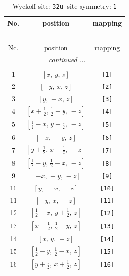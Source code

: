 \documentclass[fleqn,8pt]{jsarticle}
\begin{document}
\renewcommand{\arraystretch}{1.2}
\begin{longtable}{ccc}
\caption{Wyckoff site: {\tt 32u}, site symmetry: {\tt 1}}
 \\
 \hline \hline
No. & position & mapping \\ \hline \endfirsthead

\multicolumn{2}{l}{\tablename\ \thetable{}} \\
 \hline \hline
No. & position & mapping \\ \hline \endhead

 \hline \hline
\multicolumn{2}{r}{\footnotesize\it continued ...} \\ \endfoot

 \hline \hline
\multicolumn{2}{r}{} \\ \endlastfoot

1 & $\left[ x,\, y,\, z \right]$ & {\tt [1]} \\ \hline
2 & $\left[ - y,\, x,\, z \right]$ & {\tt [2]} \\ \hline
3 & $\left[ y,\, - x,\, z \right]$ & {\tt [3]} \\ \hline
4 & $\left[ x + \frac{1}{2},\, \frac{1}{2} - y,\, - z \right]$ & {\tt [4]} \\ \hline
5 & $\left[ \frac{1}{2} - x,\, y + \frac{1}{2},\, - z \right]$ & {\tt [5]} \\ \hline
6 & $\left[ - x,\, - y,\, z \right]$ & {\tt [6]} \\ \hline
7 & $\left[ y + \frac{1}{2},\, x + \frac{1}{2},\, - z \right]$ & {\tt [7]} \\ \hline
8 & $\left[ \frac{1}{2} - y,\, \frac{1}{2} - x,\, - z \right]$ & {\tt [8]} \\ \hline
9 & $\left[ - x,\, - y,\, - z \right]$ & {\tt [9]} \\ \hline
10 & $\left[ y,\, - x,\, - z \right]$ & {\tt [10]} \\ \hline
11 & $\left[ - y,\, x,\, - z \right]$ & {\tt [11]} \\ \hline
12 & $\left[ \frac{1}{2} - x,\, y + \frac{1}{2},\, z \right]$ & {\tt [12]} \\ \hline
13 & $\left[ x + \frac{1}{2},\, \frac{1}{2} - y,\, z \right]$ & {\tt [13]} \\ \hline
14 & $\left[ x,\, y,\, - z \right]$ & {\tt [14]} \\ \hline
15 & $\left[ \frac{1}{2} - y,\, \frac{1}{2} - x,\, z \right]$ & {\tt [15]} \\ \hline
16 & $\left[ y + \frac{1}{2},\, x + \frac{1}{2},\, z \right]$ & {\tt [16]} \\ \hline

\end{longtable}
\end{document}
